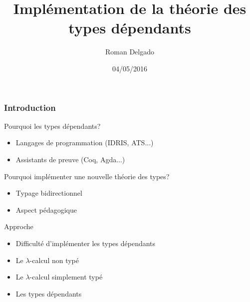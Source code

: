 \documentclass{beamer}
\title{Implémentation de la théorie des types dépendants}
\author{Roman Delgado}
\institute[\textsc{Upmc}]{Université Pierre et Marie Curie}
\date{04/05/2016}
\begin{document}
\begin{frame}

\titlepage

\end{frame}


\begin{frame}
  \frametitle{Introduction}

  \begin{block}{Pourquoi les types dépendants?}
    \begin{itemize}
    \item Langages de programmation (IDRIS, ATS...)
    \item Assistants de preuve (Coq, Agda...)
    \end{itemize}
  \end{block}

  \begin{block}{Pourquoi implémenter une nouvelle théorie des types?}
    \begin{itemize}
    \item Typage bidirectionnel
    \item Aspect pédagogique
    \end{itemize}
  \end{block}  
  \begin{block}{Approche}
    \begin{itemize}
    \item Difficulté d'implémenter les types dépendants 

    \item Le $\lambda$-calcul non typé 
    \item Le $\lambda$-calcul simplement typé 
    \item Les types dépendants
    \end{itemize}
  \end{block}

\end{frame}
\newenvironment{bnf}
               {\[\begin{array}{lcl@{\qquad}r}}
               {\end{array}\]}
\end{document}
